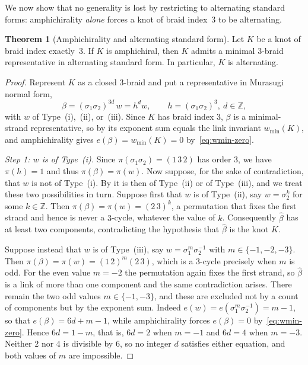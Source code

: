 \documentclass[11pt]{article}
\theoremstyle{definition}
\newtheorem{theorem}{Theorem}[section]
\begin{document}
\noindent We now show that no generality is lost by restricting to alternating standard
forms: amphichirality \emph{alone} forces a knot of braid index~$3$ to be alternating.

\begin{theorem}[Amphichirality and alternating standard form]
\label{thm:amphi-implies-alt}
Let $K$ be a knot of braid index exactly~$3$. If $K$ is amphichiral,
then $K$ admits a minimal $3$-braid representative in alternating
standard form. In particular, $K$ is alternating.
\end{theorem}

\begin{proof}
Represent $K$ as a closed $3$-braid and put a representative in Murasugi normal form,
\[
\beta=(\sigma_1\sigma_2)^{3d}\,w=h^{d}w,\qquad h=(\sigma_1\sigma_2)^{3},\ d\in\mathbb{Z},
\]
with $w$ of Type~(i),~(ii), or~(iii). Since $K$ has braid index $3$, $\beta$ is a
minimal-strand representative, so by  its
exponent sum equals the link invariant $w_{\min}(K)$, and amphichirality gives
$e(\beta)=w_{\min}(K)=0$ by~\eqref{eq:wmin-zero}.

\smallskip
\noindent\emph{Step 1: $w$ is of Type~\textup{(i)}.}
Since $\pi(\sigma_1\sigma_2)=(1\,3\,2)$ has order $3$, we have $\pi(h)=1$ and thus
$\pi(\beta)=\pi(w)$. Now suppose, for the sake of contradiction, that $w$ is not of Type~(i). By
 it is then of Type~(ii) or of Type~(iii), and we treat these two
possibilities in turn. Suppose first that $w$ is of Type~(ii), say $w=\sigma_2^{k}$ for some
$k\in\mathbb{Z}$. Then $\pi(\beta)=\pi(w)=(2\,3)^{k}$, a permutation that fixes the
first strand and hence is never a $3$-cycle, whatever the value of $k$. Consequently
$\widehat{\beta}$ has at least two components, contradicting the hypothesis that
$\widehat{\beta}$ is the knot $K$.
 
Suppose instead that $w$ is of Type~(iii), say $w=\sigma_1^{m}\sigma_2^{-1}$ with
$m\in\{-1,-2,-3\}$. Then $\pi(\beta)=\pi(w)=(1\,2)^{m}(2\,3)$, which is a $3$-cycle
precisely when $m$ is odd. For the even value $m=-2$ the permutation again fixes the
first strand, so $\widehat{\beta}$ is a link of more than one component and the same
contradiction arises. There remain the two odd values $m\in\{-1,-3\}$, and these are
excluded not by a count of components but by the exponent sum. Indeed
$e(w)=e(\sigma_1^{m}\sigma_2^{-1})=m-1$, so that $e(\beta)=6d+m-1$, while
amphichirality forces $e(\beta)=0$ by~\eqref{eq:wmin-zero}. Hence $6d=1-m$, that is,
$6d=2$ when $m=-1$ and $6d=4$ when $m=-3$. Neither $2$ nor $4$ is divisible by $6$, so
no integer $d$ satisfies either equation, and both values of $m$ are impossible.
 

\end{proof}
\end{document}
